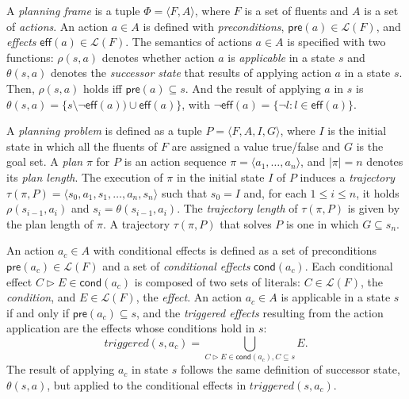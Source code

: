 \documentclass[letterpaper]{article} %
\newcommand{\tup}[1]{{\langle #1 \rangle}}
\newcommand{\pre}{\mathsf{pre}}     %
\newcommand{\eff}{\mathsf{eff}}     %
\newcommand{\cond}{\mathsf{cond}}   %
\begin{document}
A {\em planning frame} is a tuple $\Phi=\tup{F,A}$, where $F$ is a set of fluents and $A$ is a set of \emph{actions}. An action $a\in A$ is defined with {\em preconditions}, $\pre(a)\in\mathcal{L}(F)$,  and {\em effects} $\eff(a)\in\mathcal{L}(F)$. The semantics of actions $a\in A$ is specified with two functions: $\rho(s,a)$ denotes whether action $a$ is {\em applicable} in a state $s$ and $\theta(s,a)$ denotes the {\em successor state} that results of applying action $a$ in a state $s$. Then, $\rho(s,a)$ holds iff $\pre(a)\subseteq s$. And the result of applying $a$ in $s$ is $\theta(s,a)=\{s\setminus\neg\eff(a))\cup\eff(a)\}$, with $\neg\eff(a) = \{\neg l : l \in \eff(a)\}$.

A {\em planning problem} is defined as a tuple $P=\tup{F,A,I,G}$, where $I$ is the initial state in which all the fluents of $F$ are assigned a value true/false and $G$ is the goal set. A {\em plan} $\pi$ for $P$ is an action sequence $\pi=\tup{a_1, \ldots, a_n}$, and $|\pi|=n$ denotes its {\em plan length}. The execution of $\pi$ in the initial state $I$ of $P$ induces a {\em trajectory} $\tau(\pi,P)=\tup{s_0, a_1, s_1, \ldots, a_n, s_n}$ such that $s_0=I$ and, for each {\small $1\leq i\leq n$}, it holds $\rho(s_{i-1},a_i)$ and $s_i=\theta(s_{i-1},a_i)$. The {\em trajectory length} of $\tau(\pi,P)$ is given by the plan length of $\pi$. A trajectory $\tau(\pi,P)$ that solves $P$ is one in which $G \subseteq s_n$.

%

An action $a_c\in A$ with conditional effects is defined as a set of preconditions $\pre(a_c)\in\mathcal{L}(F)$ and a set of {\em conditional effects} $\cond(a_c)$. Each conditional effect $C\rhd E\in\cond(a_c)$ is composed of two sets of literals: $C\in\mathcal{L}(F)$, the {\em condition}, and $E\in\mathcal{L}(F)$, the {\em effect}. An action $a_c\in A$ is applicable in a state $s$ if and only if $\pre(a_c)\subseteq s$, and the {\em triggered effects} resulting from the action application are the effects whose conditions hold in $s$:
\[
triggered(s,a_c)=\bigcup\limits_{C\rhd E\in\cond(a_c),C\subseteq s} E. 
\]
The result of applying $a_c$ in state $s$ follows the same definition of successor state, $\theta(s,a)$, but applied to the conditional effects in $triggered(s,a_c)$.
\end{document}
